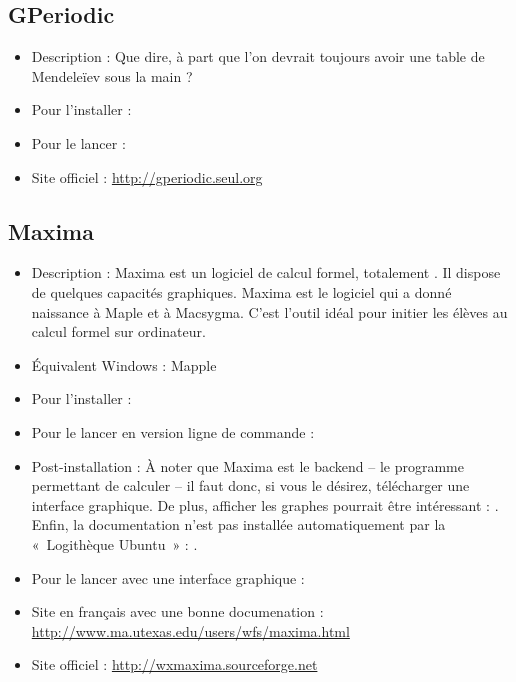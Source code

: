 \subsection{GPeriodic}
\begin{itemize}
\begingroup
{}
\item Description : Que dire, à part que l'on devrait toujours avoir une table de Mendeleïev sous la main ?{\par}
\item Pour l'installer : 
\item Pour le lancer : 
\item Site officiel : \url{http://gperiodic.seul.org}{\par}
\endgroup
\end{itemize}
\newpage
\subsection{Maxima}
\begin{itemize}
\begingroup
{}
\item Description : Maxima est un logiciel de calcul formel, totalement . Il dispose de quelques capacités graphiques. Maxima est le logiciel qui a donné naissance à Maple et à Macsygma. C'est l'outil idéal pour initier les élèves au calcul formel sur ordinateur.{\par}
\item Équivalent Windows : Mapple{\par}
\item Pour l'installer : 
\item Pour le lancer en version ligne de commande : 
\endgroup
\item Post-installation : À noter que Maxima est le backend -- le programme permettant de calculer -- il faut donc, si vous le désirez, télécharger une interface graphique. De plus, afficher les graphes pourrait être intéressant : . Enfin, la documentation n'est pas installée automatiquement par la «~Logithèque Ubuntu~» : .{\par}
\item Pour le lancer avec une interface graphique : 
\item Site en français avec une bonne documenation : \url{http://www.ma.utexas.edu/users/wfs/maxima.html}{\par}
\item Site officiel : \url{http://wxmaxima.sourceforge.net}{\par}
\end{itemize}
